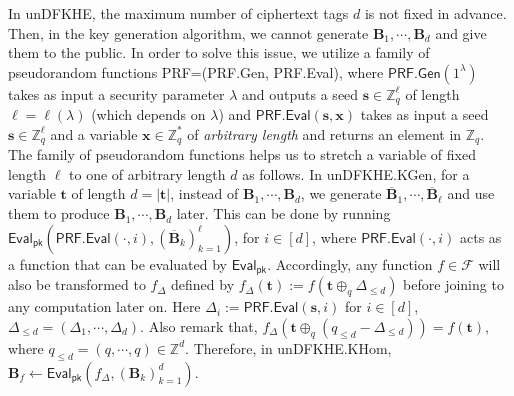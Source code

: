 \documentclass[runningheads,10pt]{llncs}
\begin{document}
In \textsf{unDFKHE}, the maximum number of ciphertext tags $d$ is not fixed  in advance. 
Then, in the key generation algorithm, we cannot generate $\textbf{B}_1, \cdots, \textbf{B}_d$ and give them to the public. 
In order to solve this issue, we utilize a  family of pseudorandom functions \textsf{PRF}=(\textsf{PRF.Gen}, \textsf{PRF.Eval}), 
where $\textsf{PRF.Gen}(1^\lambda)$ takes as input a security parameter $\lambda$ and outputs a seed 
$\textbf{s} \in \mathbb{Z}_q^\ell$ of length $\ell=\ell({\lambda})$ (which depends on  $\lambda$) and $\textsf{PRF.Eval}(\textbf{s},\textbf{x})$ 
takes as input a seed $\textbf{s} \in \mathbb{Z}_q^{\ell}$ and a variable $\textbf{x}\in \mathbb{Z}_q^*$ of \textit{arbitrary length} and  
returns an element in $\mathbb{Z}_q$. 
The family of pseudorandom functions  helps us to stretch a variable of fixed length $\ell$ to one of arbitrary length $d $ as follows. In \textsf{unDFKHE.KGen}, for a variable $\textbf{t}$ of length $d=|\textbf{t}|$, instead of  $\textbf{B}_1, \cdots, \textbf{B}_d$, we generate $\overline{\textbf{B}}_1, \cdots, \overline{\textbf{B}}_\ell$ and use them to produce $\textbf{B}_1, \cdots, \textbf{B}_d$ later. This can be done by running $\textsf{Eval}_\textsf{pk}(\textsf{PRF.Eval}(\cdot,i), (\overline{\textbf{B}}_k)_{k=1}^\ell)$, for $i\in [d]$, where $\textsf{PRF.Eval}(\cdot,i)$ acts as a function that can be evaluated by $\textsf{Eval}_\textsf{pk}$. Accordingly, any function $f \in \mathcal{F}$ will also be transformed to $f_{\Delta}$ defined by $f_{\Delta}(\textbf{t}):=f(\textbf{t}\oplus_q\Delta_{\le d})$ before joining to any computation later on. Here $\Delta_i:=\textsf{PRF.Eval}(\textbf{s},i)$  for $i\in [d]$, $\Delta_{\le d}=(\Delta_1,\cdots, \Delta_d)$.  Also remark that, $f_{\Delta}(\textbf{t}\oplus_q (q_{\le d}-\Delta_{\le d}))=f(\textbf{t})$, where $q_{\le d}=(q, \cdots, q) \in \mathbb{Z}^d$.
Therefore, in \textsf{unDFKHE.KHom},  $\textbf{B}_{f} \leftarrow \textsf{Eval}_\textsf{pk}(f_{\Delta}, (\textbf{B}_k)_{k=1}^d)$.%
\iffalse
\textcolor{red}{For a proof of the semi-adaptive security, we can follow the proof of \cite[Section 4.2]{BV16} with noting that Equation (3) in \cite{BV16} should be replaced ny $\Delta_i=\begin{cases} \mathsf{PRF.Eval}(\textbf{s},i)\oplus_q (q-\hat{t}_i) \text{ if } i \le d^*,\\  \mathsf{PRF.Eval}(\textbf{s},i), \text{ otherwise, } \end{cases}$ where $d^*$ is the number of challenged ciphertext tags.}
\fi
\end{document}

